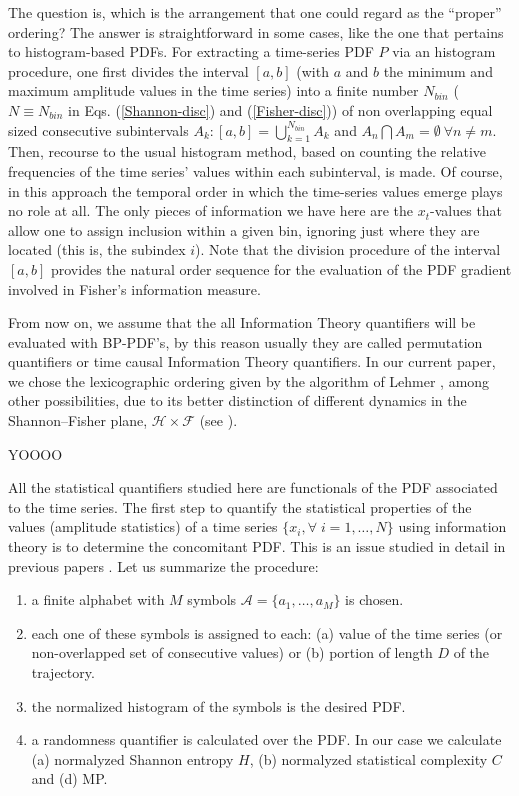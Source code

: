 The question is, which is the arrangement that one could regard as the ``proper'' ordering?
The answer is straightforward in some cases, like the one that pertains to histogram-based PDFs. 
For extracting a time-series PDF $P$ via an histogram procedure, one first divides the interval $[a,b]$ 
(with $a$ and $b$ the minimum and maximum amplitude values in the time series) into a finite number $N_{bin}$ 
($N \equiv N_{bin}$ in Eqs. (\ref{Shannon-disc}) and (\ref{Fisher-disc})) of non overlapping equal sized 
consecutive subintervals $A_k:[a,b]=\bigcup_{k=1}^{N_{bin}} A_k$ and $A_n \bigcap A_m=\emptyset~\forall n\neq m$. 
Then, recourse to the usual histogram method, based on counting the relative frequencies of the time series'
values within each subinterval, is made. 
Of course, in this approach the temporal order in which  the time-series values emerge plays no role at all. 
The only pieces of information we have here are the $x_t$-values that allow one to assign inclusion within a 
given bin, ignoring just where they are located (this is, the subindex $i$). 
Note that the division procedure of the interval $[a, b]$ provides the natural order sequence for the evaluation
of the PDF gradient involved in Fisher's information measure.

From now on, we assume that the all Information Theory quantifiers will be evaluated with BP-PDF's,
by this reason usually they are called permutation quantifiers or time causal Information Theory quantifiers.
In our current paper, we chose the lexicographic ordering given by the algorithm of Lehmer \cite{Lehmer}, 
among other possibilities, due to its better distinction of different dynamics in the Shannon--Fisher plane, 
${\mathcal H} \times {\mathcal F}$ (see \cite{Olivares2012A,Olivares2012B}). 

YOOOO

All the statistical quantifiers studied here are functionals of the PDF associated to the time series.
The first step to quantify the statistical properties of the values (amplitude statistics) of a time series $\{x_i, \forall \; i=1,\dots,N\}$ using information theory is to determine the concomitant PDF.
This is an issue studied in detail in previous papers \cite{aka varios}.
Let us summarize the procedure:
\begin{enumerate} 
	\item \label{1} a finite alphabet with $M$ symbols $\mathcal{A}=\{a_1,\dots,a_M\}$ is chosen. 
	\item \label{2} each one of these symbols is assigned to each: (a) value of the time series (or non-overlapped set of consecutive values) or (b) portion of length $D$ of the trajectory.
	\item \label{3} the normalized histogram of the symbols is the desired PDF.
	\item \label{4} a randomness quantifier is calculated over the PDF. In our case we calculate (a) normalyzed Shannon entropy $H$, (b) normalyzed statistical complexity $C$ and (d) MP.
\end{enumerate}

